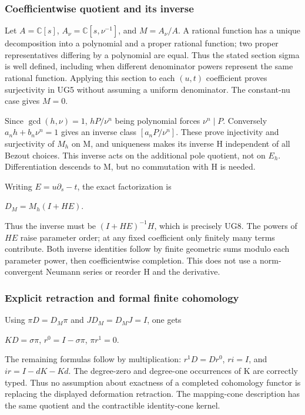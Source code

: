 \subsubsection{Coefficientwise quotient and its inverse}\label{endpoint-f1_unit_gauge_review--coefficientwise-quotient-and-its-inverse}

Let \(A=\mathbb C[s]\), \(A_\nu=\mathbb C[s,\nu^{-1}]\), and \(M=A_\nu/A\). A rational function has a unique decomposition into a polynomial and a proper rational function; two proper representatives differing by a polynomial are equal. Thus the stated section sigma is well defined, including when different denominator powers represent the same rational function. Applying this section to each \((u,t)\) coefficient proves surjectivity in UG5 without assuming a uniform denominator. The constant-nu case gives \(M=0\).

Since \(\gcd(h,\nu)=1\), \(hP/\nu^n\) being polynomial forces \(\nu^n\mid P\). Conversely \(a_n h+b_n\nu^n=1\) gives an inverse class \([a_n P/\nu^n]\). These prove injectivity and surjectivity of \(M_h\) on M, and uniqueness makes its inverse H independent of all Bezout choices. This inverse acts on the additional pole quotient, not on \(E_h\). Differentiation descends to M, but no commutation with H is needed.

Writing \(E=u\partial_s-t\), the exact factorization is

\(D_M=M_h(I+HE)\).

Thus the inverse must be \((I+HE)^{-1}H\), which is precisely UG8. The powers of \(HE\) raise parameter order; at any fixed coefficient only finitely many terms contribute. Both inverse identities follow by finite geometric sums modulo each parameter power, then coefficientwise completion. This does not use a norm-convergent Neumann series or reorder H and the derivative.

\subsubsection{Explicit retraction and formal finite cohomology}\label{endpoint-f1_unit_gauge_review--explicit-retraction-and-formal-finite-cohomology}

Using \(\pi D=D_M\pi\) and \(J D_M=D_M J=I\), one gets

\(KD=\sigma\pi\), \(r^0=I-\sigma\pi\), \(\pi r^1=0\).

The remaining formulas follow by multiplication: \(r^1D=Dr^0\), \(ri=I\), and \(ir=I-dK-Kd\). The degree-zero and degree-one occurrences of K are correctly typed. Thus no assumption about exactness of a completed cohomology functor is replacing the displayed deformation retraction. The mapping-cone description has the same quotient and the contractible identity-cone kernel.

